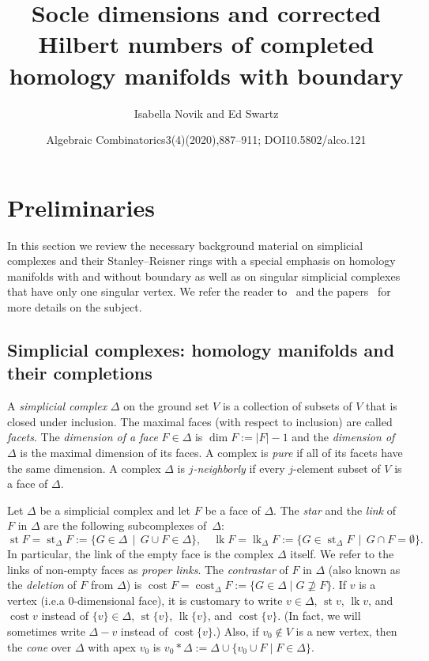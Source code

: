 \documentclass[10pt]{amsart}
\title[Socles and Hilbert numbers for completed manifolds]{Socle dimensions and corrected Hilbert numbers of completed homology manifolds with boundary}
\author{Isabella Novik and Ed Swartz}
\date{Algebraic Combinatorics3(4)(2020),887–911; DOI10.5802/alco.121}
\theoremstyle{definition}
\providecommand{\ie}{i.e.}
\DeclareMathOperator\lk{lk}
\DeclareMathOperator\st{st}
\DeclareMathOperator\cost{cost}
\begin{document}
\maketitle
\setcounter{section}{1}
\section{Preliminaries} \label{sec:Prelim}
In this section we review the necessary background material on simplicial complexes and their Stanley--Reisner rings with a special emphasis on homology manifolds with and without boundary as well as on singular simplicial complexes that have only one singular vertex. We refer the reader to~\cite[Chapter~2]{Stanley-96} and the papers~\cite{Novik-Swartz-09:Socles, Novik-Swartz-12} for more details on the subject. 

\subsection{Simplicial complexes: homology manifolds and their completions}
A \emph{simplicial complex} $\Delta$ on the ground set $V$ is a collection of subsets of $V$ that is closed under inclusion.
The maximal faces (with respect to inclusion) are called \emph{facets}. The \emph{dimension of a face} $F\in \Delta$ is $\dim F:=|F|-1$ and
the \emph{dimension of $\Delta$} is the maximal dimension of its faces. A complex is \emph{pure} if all of its facets have the same dimension. A complex $\Delta$ is \emph{$j$-neighborly} if every $j$-element subset of $V$ is a face of $\Delta$. 

Let $\Delta$ be a simplicial complex and let $F$ be a face of $\Delta$. The \emph{star} and the \emph{link} of $F$ in $\Delta$ are the following subcomplexes of~$\Delta$: 
\[
\st F=\st_\Delta F:=\{G\in \Delta \, \mid \, G\cup F\in \Delta\}, \quad
 \lk F=\lk_\Delta F:=\{G\in \st_\Delta F \, \mid \, G\cap F=\emptyset\}.
\]
In particular, the link of the empty face is the complex $\Delta$ itself. We refer to the links of non-empty faces as \emph{proper links}. The \emph{contrastar} of $F$ in $\Delta$ (also known as the \emph{deletion} of $F$ from $\Delta$) is $\cost F=\cost_\Delta F:=\{G\in \Delta \mid G\not\supseteq F\}$. If $v$ is a vertex (\ie a $0$-dimensional face), it is customary to write $v\in\Delta$, $\st v$, $\lk v$, and $\cost v$ instead of $\{v\}\in\Delta$, $\st \{v\}$, $\lk\{v\}$, and $\cost\{v\}$. (In fact, we will sometimes write $\Delta-v$ instead of $\cost\{v\}$.)
Also, if $v_0\notin V$ is a new vertex, then the \emph{cone} over $\Delta$ with apex $v_0$ is $v_0\ast\Delta:=\Delta \cup \{v_0\cup F \mid F\in \Delta\}$.
\end{document}
